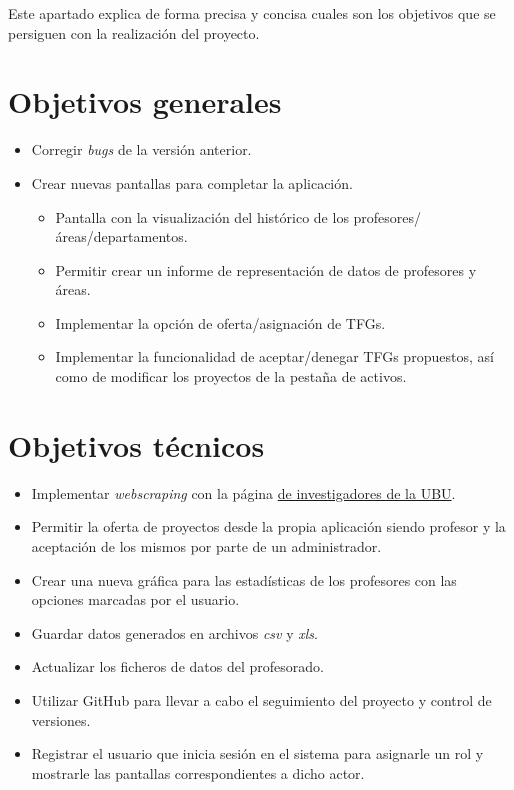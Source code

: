
Este apartado explica de forma precisa y concisa cuales son los objetivos que se persiguen con la realización del proyecto.

\section{Objetivos generales}
\begin{itemize}
	\item Corregir \emph{bugs} de la versión anterior.
	\item Crear nuevas pantallas para completar la aplicación.
		\begin{itemize}
			\item Pantalla con la visualización del histórico de los profesores/áreas/departamentos.
			\item Permitir crear un informe de representación de datos de profesores y áreas.
			\item Implementar la opción de oferta/asignación de TFGs.
			\item Implementar la funcionalidad de aceptar/denegar TFGs propuestos, así como de modificar los proyectos de la pestaña de activos.
		\end{itemize}

	
\end{itemize}
\section{Objetivos técnicos}
\begin{itemize}
	\item Implementar \emph{webscraping} con la página \href{https://investigacion.ubu.es/unidades/2682/investigadores}{de investigadores de la UBU}.
	\item Permitir la oferta de proyectos desde la propia aplicación siendo profesor y la aceptación de los mismos por parte de un administrador.
	\item Crear una nueva gráfica para las estadísticas de los profesores con las opciones marcadas por el usuario.
	\item Guardar datos generados en archivos \emph{csv} y \emph{xls}.
	\item Actualizar los ficheros de datos del profesorado.
	\item Utilizar GitHub para llevar a cabo el seguimiento del proyecto y control de versiones.
	\item Registrar el usuario que inicia sesión en el sistema para asignarle un rol y mostrarle las pantallas correspondientes a dicho actor.
\end{itemize}
